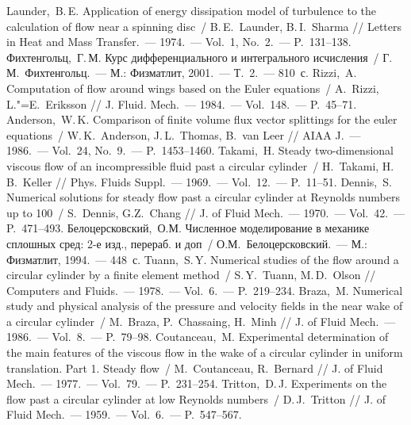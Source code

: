 \begin{thebibliography}{999}
%
\Eng
{} Launder,~B.\,E. Application of energy dissipation model of turbulence to
                 the calculation of flow near a spinning disc~/ B.\,E.~Launder, B.\,I.~Sharma // 
                 Letters in Heat and Mass Transfer.~--- 1974.~--- Vol.~1, No.~2.~--- P.~131--138.
%
\Rus
{}  Фихтенгольц,~Г.\,М. Курс дифференциального и интегрального 
                исчисления~/ Г.\,М.~Фихтенгольц.~--- М.: Физматлит, 2001.~--- Т.~2.~--- 810~с.
%
\Eng
{} Rizzi,~A. Computation of flow around wings based on the Euler
                       equations~/ A.~Rizzi, L."=E.~Eriksson // J. Fluid. Mech.~--- 1984.~--- 
                       Vol.~148.~--- P.~45--71.
%
\Eng
{}Anderson,~W.\,K. Comparison of finite volume flux vector splittings 
                for the euler equations~/ W.\,K.~Anderson, J.\,L.~Thomas, B.~van Leer // AIAA J.~--- 1986.~--- Vol.~24, No.~9.~--- P.~1453--1460.
%
\Eng
{}Takami,~H. Steady two-dimensional viscous flow of an incompressible fluid past a 
                circular cylinder~/ H.~Takami, H.\,B.~Keller // Phys. Fluids Suppl.~--- 1969.~--- 
                Vol.~12.~--- P.~11--51.
%
\Eng
{}Dennis,~S. Numerical solutions for steady flow past a circular cylinder at 
                Reynolds numbers up to 100~/ S.~Dennis, G.Z.~Chang // J. of Fluid Mech.~--- 
                1970.~--- Vol.~42.~--- P.~471--493.
%
\Rus
{} Белоцерсковский,~О.М. Численное моделирование в механике сплошных сред: 2-е изд., 
                   перераб. и доп~/ О.М.~Белоцерсковский.~--- М.: Физматлит, 1994.~--- 448~с.
%
\Eng
{} Tuann,~S.\,Y. Numerical studies of the flow around a circular cylinder by a 
               finite element method~/ S.\,Y.~Tuann, M.\,D.~Olson // 
               Computers and Fluids.~--- 1978.~--- Vol.~6.~--- P.~219--234.
%
\Eng
{} Braza,~M. Numerical study and physical analysis of the pressure
                and velocity fields in the near wake of a circular cylinder~/ M.~Braza, P.~Chassaing, 
                H.~Minh // J. of Fluid Mech.~--- 1986.~--- Vol.~8.~--- P.~79--98.
%
\Eng
{}Coutanceau,~M. Experimental determination of the main features of the viscous flow 
                in the wake of a circular cylinder in uniform translation. Part 1. Steady flow~/ 
                M.~Coutanceau, R.~Bernard // J. of Fluid Mech.~--- 1977.~--- Vol.~79.~--- P.~231--254.
%
\Eng
{} Tritton,~D.\,J. Experiments on the flow past a circular cylinder at low Reynolds numbers~/ 
                D.\,J.~Tritton // J. of Fluid Mech.~--- 1959.~--- Vol.~6.~--- P.~547--567.

\end{thebibliography}

